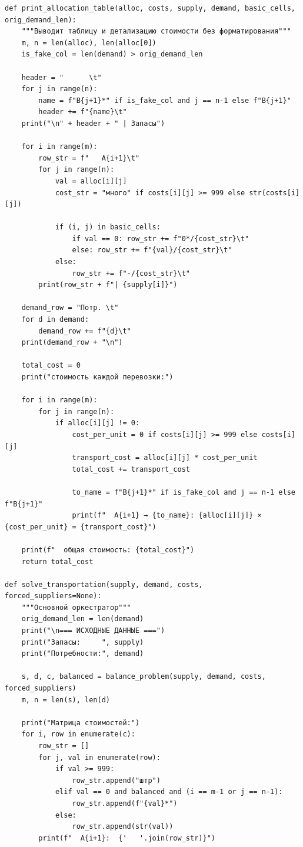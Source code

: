 \documentclass[oneside,a4paper,14pt]{extarticle}
\begin{document}
\begin{verbatim}
def print_allocation_table(alloc, costs, supply, demand, basic_cells, orig_demand_len):
    """Выводит таблицу и детализацию стоимости без форматирования"""
    m, n = len(alloc), len(alloc[0])
    is_fake_col = len(demand) > orig_demand_len

    header = "      \t"
    for j in range(n):
        name = f"B{j+1}*" if is_fake_col and j == n-1 else f"B{j+1}"
        header += f"{name}\t"
    print("\n" + header + " | Запасы")

    for i in range(m):
        row_str = f"   A{i+1}\t"
        for j in range(n):
            val = alloc[i][j]
            cost_str = "много" if costs[i][j] >= 999 else str(costs[i][j])

            if (i, j) in basic_cells:
                if val == 0: row_str += f"0*/{cost_str}\t"
                else: row_str += f"{val}/{cost_str}\t"
            else:
                row_str += f"-/{cost_str}\t"
        print(row_str + f"| {supply[i]}")

    demand_row = "Потр. \t"
    for d in demand:
        demand_row += f"{d}\t"
    print(demand_row + "\n")

    total_cost = 0
    print("стоимость каждой перевозки:")

    for i in range(m):
        for j in range(n):
            if alloc[i][j] != 0:
                cost_per_unit = 0 if costs[i][j] >= 999 else costs[i][j]
                transport_cost = alloc[i][j] * cost_per_unit
                total_cost += transport_cost

                to_name = f"B{j+1}*" if is_fake_col and j == n-1 else f"B{j+1}"
                print(f"  A{i+1} → {to_name}: {alloc[i][j]} × {cost_per_unit} = {transport_cost}")

    print(f"  общая стоимость: {total_cost}")
    return total_cost

def solve_transportation(supply, demand, costs, forced_suppliers=None):
    """Основной оркестратор"""
    orig_demand_len = len(demand)
    print("\n=== ИСХОДНЫЕ ДАННЫЕ ===")
    print("Запасы:     ", supply)
    print("Потребности:", demand)

    s, d, c, balanced = balance_problem(supply, demand, costs, forced_suppliers)
    m, n = len(s), len(d)

    print("Матрица стоимостей:")
    for i, row in enumerate(c):
        row_str = []
        for j, val in enumerate(row):
            if val >= 999:
                row_str.append("штр")
            elif val == 0 and balanced and (i == m-1 or j == n-1):
                row_str.append(f"{val}*")
            else:
                row_str.append(str(val))
        print(f"  A{i+1}:  {'   '.join(row_str)}")


\end{verbatim}
\end{document}
